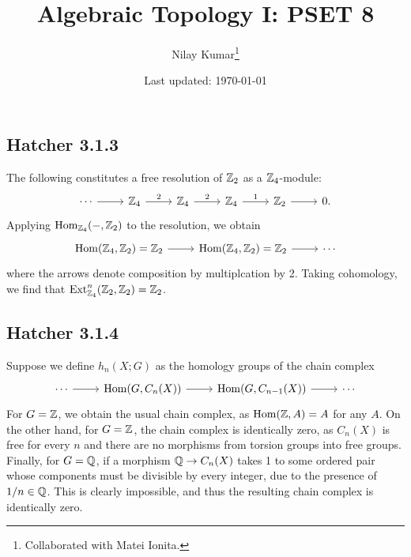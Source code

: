 \documentclass{../mathnotes}
\title{Algebraic Topology I: PSET 8}
\author{Nilay Kumar\footnote{Collaborated with Matei Ionita.}}
\date{Last updated: \today}
\begin{document}
\maketitle

\subsection*{Hatcher 3.1.3}
The following constitutes a free resolution of $\mathbb{Z}_2$ as a $\mathbb{Z}_4$-module:
\begin{equation*}
    \begin{tikzcd}
        \cdots\ar{r} & \Z_4\ar{r}{2} & \Z_4\ar{r}{2} & \Z_4\ar{r}{1} & \Z_2\ar{r} & 0.
    \end{tikzcd}
\end{equation*}
Applying $\operatorname{Hom}_{\mathbb{Z}_4}(-,\mathbb{Z}_2)$ to the resolution, we obtain
\begin{equation*}
    \begin{tikzcd}
        \Hom(\Z_4,\Z_2)\ar{r}=\Z_2 & \Hom(\Z_4,\Z_2)=\Z_2\ar{r} & \cdots
    \end{tikzcd}
\end{equation*}
where the arrows denote composition by multiplcation by 2. Taking cohomology,
we find that $\operatorname{Ext}^n_{\mathbb{Z}_4}(\mathbb{Z}_2,\mathbb{Z}_2)=\mathbb{Z}_2$.

\subsection*{Hatcher 3.1.4}
Suppose we define $h_n(X;G)$ as the homology groups of the chain complex
\begin{equation*}
    \begin{tikzcd}
        \cdots\ar{r} & \Hom(G,C_n(X))\ar{r} & \Hom(G,C_{n-1}(X))\ar{r} & \cdots
    \end{tikzcd}
\end{equation*}
For $G=\mathbb{Z}$, we obtain the usual chain complex, as $\operatorname{Hom}(\mathbb{Z},A)=A$ for any $A$.
On the other hand, for $G=\mathbb{Z}$, the chain complex is identically zero, as $C_n(X)$
is free for every $n$ and there are no morphisms from torsion groups into free groups.
Finally, for $G=\mathbb{Q}$, if a morphism $\mathbb{Q}\to C_n(X)$ takes 1 to some ordered pair whose
components must be divisible by every integer, due to the presence of $1/n\in\mathbb{Q}$.
This is clearly impossible, and thus the resulting chain complex is identically
zero.
\end{document}
